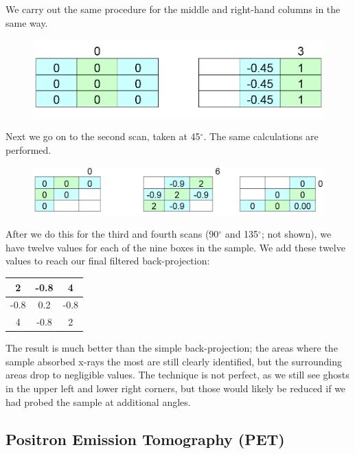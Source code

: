 We carry out the same procedure for the middle and right-hand columns in the same way.
\begin{figure}[!htb]
	\centering
	\includegraphics[width=\textwidth]{./figures/Topic10/CTFilter2.png}
	\label{CTFil2}
\end{figure}
Next we go on to the second scan, taken at 45$^{\circ}$.  The same calculations are performed.  
\begin{figure}[!htb]
	\centering
	\includegraphics[width=\textwidth]{./figures/Topic10/CTFilter3.png}
	\label{CTFil3}
\end{figure}
After we do this for the third and fourth scans (90$^{\circ}$ and 135$^{\circ}$; not shown), we have twelve values for each of the nine boxes in the sample.  We add these twelve values to reach our final filtered back-projection:
\begin{table}[!h]
\begin{center}
\begin{tabular}{|c|c|c|}
\hline
2 & -0.8 & 4\\
\hline
-0.8 & 0.2 & -0.8\\
\hline
4 & -0.8 & 2\\
\hline
\end{tabular}
\label{table10-3}
\end{center}
\end{table}

The result is much better than the simple back-projection; the areas where the sample absorbed x-rays the most are still clearly identified, but the surrounding areas drop to negligible values.  The technique is not perfect, as we still see ghosts in the upper left and lower right corners, but those would likely be reduced if we had probed the sample at additional angles.

\subsection{Positron Emission Tomography (PET)}

